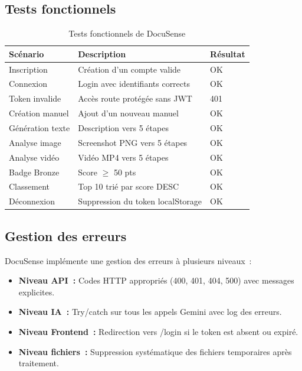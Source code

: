 \documentclass[12pt, a4paper, twoside, openany]{report}
\begin{document}
\subsection{Tests fonctionnels}

\begin{table}[H]
  \centering
  \caption{Tests fonctionnels de DocuSense}
  \label{tab:tests-fonc}
  \begin{tabularx}{\textwidth}{l X l}
    \toprule
    \textbf{Sc\'enario} & \textbf{Description} & \textbf{R\'esultat} \\
    \midrule
    Inscription     & Cr\'eation d'un compte valide       & \textcolor{DSgreen}{OK} \\
    Connexion       & Login avec identifiants corrects    & \textcolor{DSgreen}{OK} \\
    Token invalide  & Acc\`es route prot\'eg\'ee sans JWT & \textcolor{DSgreen}{401} \\
    Cr\'eation manuel & Ajout d'un nouveau manuel         & \textcolor{DSgreen}{OK} \\
    G\'en\'eration texte & Description vers 5 \'etapes   & \textcolor{DSgreen}{OK} \\
    Analyse image   & Screenshot PNG vers 5 \'etapes     & \textcolor{DSgreen}{OK} \\
    Analyse vid\'eo & Vid\'eo MP4 vers 5 \'etapes        & \textcolor{DSgreen}{OK} \\
    Badge Bronze    & Score $\geq$ 50 pts                 & \textcolor{DSgreen}{OK} \\
    Classement      & Top 10 tri\'e par score DESC        & \textcolor{DSgreen}{OK} \\
    D\'econnexion   & Suppression du token localStorage  & \textcolor{DSgreen}{OK} \\
    \bottomrule
  \end{tabularx}
\end{table}

\subsection{Gestion des erreurs}

DocuSense impl\'emente une gestion des erreurs \`a plusieurs niveaux~:

\begin{itemize}
  \item \textbf{Niveau API~:} Codes HTTP appropri\'es (400, 401, 404, 500) avec
        messages explicites.
  \item \textbf{Niveau IA~:} Try/catch sur tous les appels Gemini avec log des
        erreurs.
  \item \textbf{Niveau Frontend~:} Redirection vers /login si le token est absent
        ou expir\'e.
  \item \textbf{Niveau fichiers~:} Suppression syst\'ematique des fichiers
        temporaires apr\`es traitement.
\end{itemize}
\end{document}
